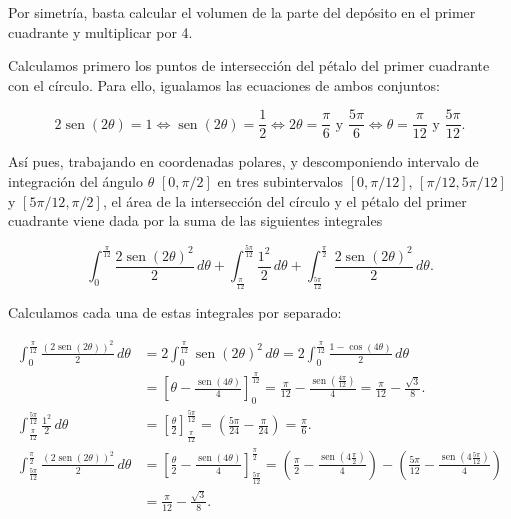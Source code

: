 \documentclass[
  spanish,
  a4paper,
]{scrreport}
\theoremstyle{definition}
\theoremstyle{remark}
\begin{document}
\begin{tcolorbox}[enhanced jigsaw, arc=.35mm, bottomrule=.15mm, bottomtitle=1mm, breakable, colback=white, colbacktitle=quarto-callout-tip-color!10!white, colframe=quarto-callout-tip-color-frame, coltitle=black, left=2mm, leftrule=.75mm, opacityback=0, opacitybacktitle=0.6, rightrule=.15mm, title=\textcolor{quarto-callout-tip-color}{\faLightbulb}\hspace{0.5em}{Solución}, titlerule=0mm, toprule=.15mm, toptitle=1mm]

Por simetría, basta calcular el volumen de la parte del depósito en el
primer cuadrante y multiplicar por 4.

Calculamos primero los puntos de intersección del pétalo del primer
cuadrante con el círculo. Para ello, igualamos las ecuaciones de ambos
conjuntos:

\[
2\operatorname{sen}(2\theta) = 1 \Leftrightarrow \operatorname{sen}(2\theta) = \frac{1}{2} \Leftrightarrow 2\theta = \frac{\pi}{6} \mbox{ y } \frac{5\pi}{6} \Leftrightarrow \theta = \frac{\pi}{12} \mbox{ y }\frac{5\pi}{12}.
\]

Así pues, trabajando en coordenadas polares, y descomponiendo intervalo
de integración del ángulo \(\theta\) \([0, \pi/2]\) en tres
subintervalos \([0,\pi/12]\), \([\pi/12, 5\pi/12]\) y
\([5\pi/12, \pi/2]\), el área de la intersección del círculo y el pétalo
del primer cuadrante viene dada por la suma de las siguientes integrales

\[
\int_0^{\frac{\pi}{12}} \frac{2\operatorname{sen}(2\theta)^2}{2}\,d\theta + \int_{\frac{\pi}{12}}^{\frac{5\pi}{12}} \frac{1^2}{2}\,d\theta + \int_{\frac{5\pi}{12}}^{\frac{\pi}{2}} \frac{2\operatorname{sen}(2\theta)^2}{2}\,d\theta.
\]

Calculamos cada una de estas integrales por separado:

\begin{align*}
\int_0^{\frac{\pi}{12}} \frac{(2\operatorname{sen}(2\theta))^2}{2}\,d\theta
&= 2\int_0^{\frac{\pi}{12}} \operatorname{sen}(2\theta)^2\,d\theta
= 2\int_0^{\frac{\pi}{12}} \frac{1 - \cos(4\theta)}{2}\,d\theta \\
&= \left[\theta - \frac{\operatorname{sen}(4\theta)}{4} \right]_0^{\frac{\pi}{12}}
= \frac{\pi}{12} - \frac{\operatorname{sen}(\frac{4\pi}{12})}{4}
= \frac{\pi}{12} - \frac{\sqrt{3}}{8}.\\
\int_{\frac{\pi}{12}}^{\frac{5\pi}{12}} \frac{1^2}{2}\,d\theta
&= \left[ \frac{\theta}{2} \right]_{\frac{\pi}{12}}^{\frac{5\pi}{12}}
= \left( \frac{5\pi}{24} - \frac{\pi}{24} \right)
= \frac{\pi}{6}.\\
\int_{\frac{5\pi}{12}}^{\frac{\pi}{2}} \frac{(2\operatorname{sen}(2\theta))^2}{2}\,d\theta 
&= \left[ \frac{\theta}{2} - \frac{\operatorname{sen}(4\theta)}{4} \right]_\frac{5\pi}{12}^{\frac{\pi}{2}} 
= \left( \frac{\pi}{2} - \frac{\operatorname{sen}(4\frac{\pi}{2})}{4} \right) - \left( \frac{5\pi}{12} - \frac{\operatorname{sen}(4\frac{5\pi}{12})}{4} \right) \\
&= \frac{\pi}{12} - \frac{\sqrt{3}}{8}.
\end{align*}


\end{tcolorbox}
\end{document}
